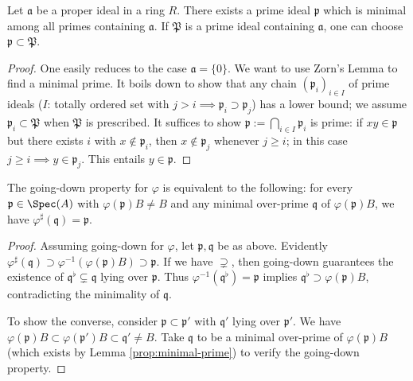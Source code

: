 \begin{lemma}\label{prop:minimal-prime}
	Let $\mathfrak{a}$ be a proper ideal in a ring $R$. There exists a prime ideal $\mathfrak{p}$ which is minimal among all primes containing $\mathfrak{a}$. If $\mathfrak{P}$ is a prime ideal containing $\mathfrak{a}$, one can choose $\mathfrak{p} \subset \mathfrak{P}$.
\end{lemma}
\begin{proof}
	One easily reduces to the case $\mathfrak{a} = \{0\}$. We want to use Zorn's Lemma to find a minimal prime. It boils down to show that any chain $(\mathfrak{p}_i)_{i \in I}$ of prime ideals ($I$: totally ordered set with $j > i \implies \mathfrak{p}_i \supset \mathfrak{p}_j$) has a lower bound; we assume $\mathfrak{p}_i \subset \mathfrak{P}$ when $\mathfrak{P}$ is prescribed. It suffices to show $\mathfrak{p} := \bigcap_{i \in I} \mathfrak{p}_i$ is prime: if $xy \in \mathfrak{p}$ but there exists $i$ with $x \notin \mathfrak{p}_i$, then $x \notin \mathfrak{p}_j$ whenever $j \geq i$; in this case $j \geq i \implies y \in \mathfrak{p}_j$. This entails $y \in \mathfrak{p}$.
\end{proof}

\begin{lemma}
	The going-down property for $\varphi$ is equivalent to the following: for every $\mathfrak{p} \in \Spec(A)$ with $\varphi(\mathfrak{p})B \neq B$ and any minimal over-prime $\mathfrak{q}$ of $\varphi(\mathfrak{p})B$, we have $\varphi^\sharp(\mathfrak{q}) = \mathfrak{p}$.
\end{lemma}
\begin{proof}
	Assuming going-down for $\varphi$, let $\mathfrak{p}, \mathfrak{q}$ be as above. Evidently $\varphi^\sharp(\mathfrak{q}) \supset \varphi^{-1}(\varphi(\mathfrak{p})B) \supset \mathfrak{p}$. If we have $\supsetneq$, then going-down guarantees the existence of $\mathfrak{q}^\flat \subsetneq \mathfrak{q}$ lying over $\mathfrak{p}$. Thus $\varphi^{-1}(\mathfrak{q}^\flat) = \mathfrak{p}$ implies $\mathfrak{q}^\flat \supset \varphi(\mathfrak{p})B$, contradicting the minimality of $\mathfrak{q}$.
	
	To show the converse, consider $\mathfrak{p} \subset \mathfrak{p}'$ with $\mathfrak{q}'$ lying over $\mathfrak{p}'$. We have $\varphi(\mathfrak{p})B \subset \varphi(\mathfrak{p}')B \subset \mathfrak{q}' \neq B$. Take $\mathfrak{q}$ to be a minimal over-prime of $\varphi(\mathfrak{p})B$ (which exists by Lemma \ref{prop:minimal-prime}) to verify the going-down property.
\end{proof}

